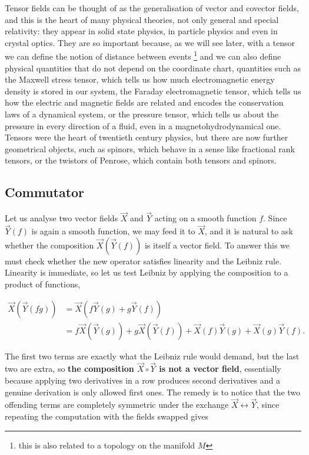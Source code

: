         Tensor fields can be thought of as the generalisation of vector and covector fields, and this is the heart of many physical theories, not only general and special relativity: they appear in solid state physics, in particle physics and even in crystal optics. They are so important because, as we will see later, with a tensor we can define the notion of distance between events \footnote{this is also related to a topology on the manifold $M$} and we can also define physical quantities that do not depend on the coordinate chart, quantities such as the Maxwell stress tensor, which tells us how much electromagnetic energy density is stored in our system, the Faraday electromagnetic tensor, which tells us how the electric and magnetic fields are related and encodes the conservation laws of a dynamical system, or the pressure tensor, which tells us about the pressure in every direction of a fluid, even in a magnetohydrodynamical one.\\

        Tensors were the heart of twentieth century physics, but there are now further geometrical objects, such as spinors, which behave in a sense like fractional rank tensors, or the twistors of Penrose, which contain both tensors and spinors.

    \subsection{Commutator}

        Let us analyse two vector fields $\Vec{X}$ and $\Vec{Y}$ acting on a smooth function $f$. Since $\Vec{Y}(f)$ is again a smooth function, we may feed it to $\Vec{X}$, and it is natural to ask whether the composition $\Vec{X}\left(\Vec{Y}(f)\right)$ is itself a vector field. To answer this we must check whether the new operator satisfies linearity and the Leibniz rule. Linearity is immediate, so let us test Leibniz by applying the composition to a product of functions,

        \begin{align*}
            \Vec{X}\left(\Vec{Y}(fg)\right) &= \Vec{X}\left( f\Vec{Y}(g) + g \Vec{Y}(f)\right)\\
            &= f \Vec{X}\left(\Vec{Y}(g)\right) + g\Vec{X}\left(\Vec{Y}(f)\right) + \Vec{X}(f)\Vec{Y}(g) + \Vec{X}(g)\Vec{Y}(f).
        \end{align*}

        The first two terms are exactly what the Leibniz rule would demand, but the last two are extra, so \textbf{the composition $\Vec{X}\circ\Vec{Y}$ is not a vector field}, essentially because applying two derivatives in a row produces second derivatives and a genuine derivation is only allowed first ones. The remedy is to notice that the two offending terms are completely symmetric under the exchange $\Vec{X}\leftrightarrow\Vec{Y}$, since repeating the computation with the fields swapped gives

